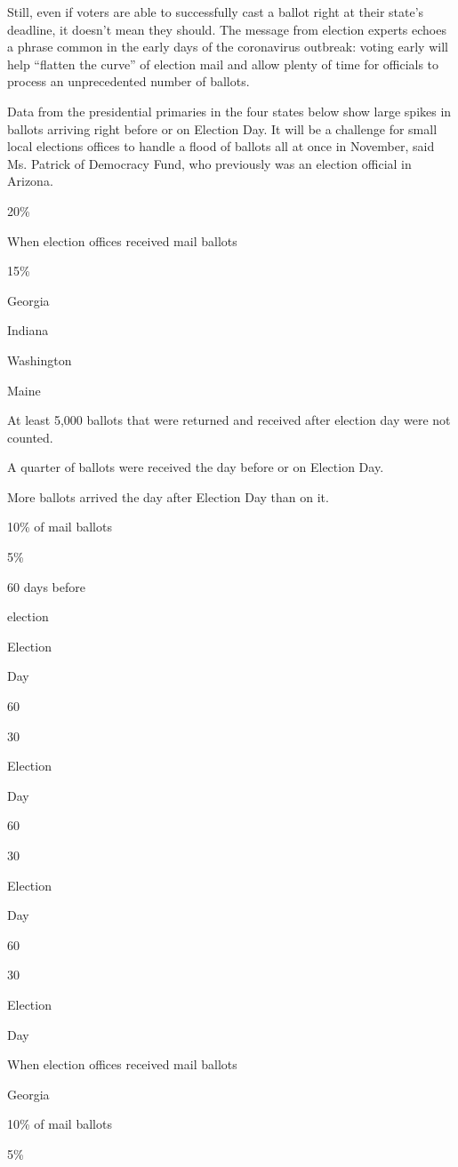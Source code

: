 Still, even if voters are able to successfully cast a ballot right at
their state's deadline, it doesn't mean they should. The message from
election experts echoes a phrase common in the early days of the
coronavirus outbreak: voting early will help ``flatten the curve'' of
election mail and allow plenty of time for officials to process an
unprecedented number of ballots.

Data from the presidential primaries in the four states below show large
spikes in ballots arriving right before or on Election Day. It will be a
challenge for small local elections offices to handle a flood of ballots
all at once in November, said Ms. Patrick of Democracy Fund, who
previously was an election official in Arizona.

20\%

When election offices received mail ballots

15\%

Georgia

Indiana

Washington

Maine

At least 5,000 ballots that were returned and received after election
day were not counted.

A quarter of ballots were received the day before or on Election Day.

More ballots arrived the day after Election Day than on it.

10\% of mail ballots

5\%

60 days before

election

Election

Day

60

30

Election

Day

60

30

Election

Day

60

30

Election

Day

When election offices received mail ballots

Georgia

10\% of mail ballots

5\%

